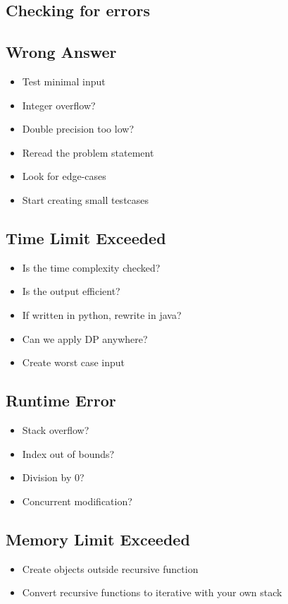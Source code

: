 \documentclass[8pt,a4paper,landscape,oneside]{amsart}
\begin{document}
\begin{multicols*}{3}
        
\section{Checking for errors}
  \subsection{Wrong Answer}
    \begin{itemize}
    \item Test minimal input
    \item Integer overflow?
    \item Double precision too low?
    \item Reread the problem statement
    \item Look for edge-cases
    \item Start creating small testcases
    \end{itemize}
  \subsection{Time Limit Exceeded}
    \begin{itemize}
    \item Is the time complexity checked?
    \item Is the output efficient?
    \item If written in python, rewrite in java?
    \item Can we apply DP anywhere?
    \item Create worst case input
    \end{itemize}
  \subsection{Runtime Error}
    \begin{itemize}
    \item Stack overflow?
    \item Index out of bounds?
    \item Division by $0$?
    \item Concurrent modification?
    \end{itemize}
  \subsection{Memory Limit Exceeded}
    \begin{itemize}
    \item Create objects outside recursive function
    \item Convert recursive functions to iterative with your own stack
    \end{itemize}
        

\end{multicols*}
\end{document}
